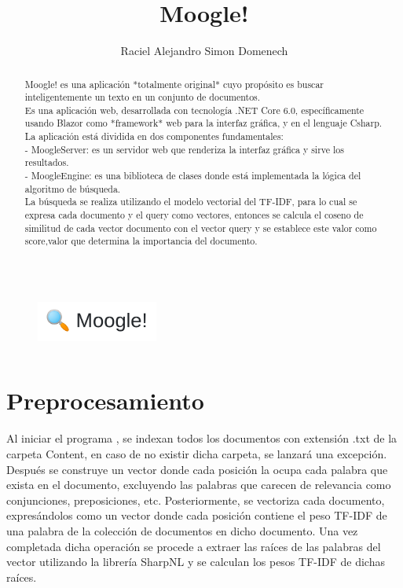 \documentclass{report}
\title{\Huge Moogle!}
\author{\LARGE Raciel Alejandro Simon Domenech}
\date{}
\begin{document}
\begin{titlepage}
  
  


\begin{figure}[b]
  \centering
  \includegraphics[width = 4cm,height = 2cm]{moogle.png}
\end{figure}

\maketitle

\end{titlepage}
\tableofcontents
\begin{abstract}
  Moogle! es una aplicación *totalmente original* cuyo propósito es buscar inteligentemente un texto en 
un conjunto de documentos.\\
Es una aplicación web, desarrollada con tecnología .NET Core 6.0, específicamente usando Blazor como 
*framework* web para la interfaz gráfica, y en el lenguaje Csharp.\\
La aplicación está dividida en dos componentes fundamentales:\\
- MoogleServer: es un servidor web que renderiza la interfaz gráfica y sirve los resultados.\\
- MoogleEngine: es una biblioteca de clases donde está implementada la lógica del algoritmo de 
búsqueda.\\
La búsqueda se realiza utilizando el modelo vectorial del TF-IDF, para lo cual se expresa cada documento 
y el query como vectores, entonces se calcula el coseno de similitud de cada vector documento con el 
vector query y se establece este valor como score,valor que determina la importancia del documento.
\end{abstract}
\chapter{Preprocesamiento}
 Al iniciar el programa , se indexan todos los documentos con extensión .txt de la carpeta Content, en caso de no existir
  dicha carpeta, se lanzará una excepción. Después se construye un vector donde cada posición la ocupa cada palabra 
  que exista en el documento, excluyendo las palabras que carecen de relevancia como conjunciones, preposiciones, etc.
  Posteriormente, se vectoriza cada documento, expresándolos como un vector donde cada posición contiene el peso TF-IDF
  de una palabra de la colección de documentos en dicho documento. Una vez completada dicha operación se procede a extraer
  las raíces de las palabras del vector utilizando la librería SharpNL y se calculan los pesos
  TF-IDF de dichas raíces.  
\end{document}
